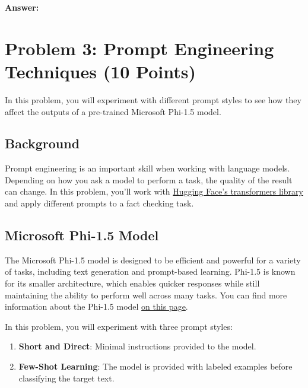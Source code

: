 \documentclass[11pt, oneside]{article}   	%
\begin{document}
\textbf{Answer:} \\


 

\section*{Problem 3: Prompt Engineering Techniques (10 Points)}

In this problem, you will experiment with different prompt styles to see how they affect the outputs of a pre-trained Microsoft Phi-1.5 model.

\subsection*{Background}
Prompt engineering is an important skill when working with language models. Depending on how you ask a model to perform a task, the quality of the result can change. In this problem, you'll work with \href{https://huggingface.co/docs/transformers/main_classes/pipelines}{Hugging Face’s transformers library} and apply different prompts to a fact checking task.

\subsection*{Microsoft Phi-1.5 Model}
The Microsoft Phi-1.5 model is designed to be efficient and powerful for a variety of tasks, including text generation and prompt-based learning. Phi-1.5 is known for its smaller architecture, which enables quicker responses while still maintaining the ability to perform well across many tasks. You can find more information about the Phi-1.5 model \href{https://huggingface.co/microsoft/phi-1_5}{on this page}. 

In this problem, you will experiment with three prompt styles:
\begin{enumerate}
    \item \textbf{Short and Direct}: Minimal instructions provided to the model.
    \item \textbf{Few-Shot Learning}: The model is provided with labeled examples before classifying the target text.
\end{enumerate}
\end{document}
